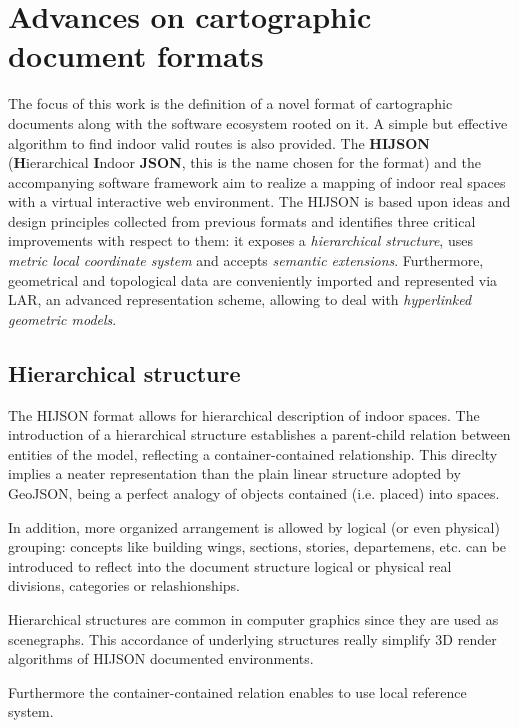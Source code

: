 
\section{Advances on cartographic document formats}\label{advances-on-cartographic-document-format}

The focus of this work is the definition of a novel format of cartographic
documents along with the software ecosystem rooted on it. A simple but
effective algorithm to find indoor valid routes is also provided. The
\textbf{HIJSON} (\textbf{H}ierarchical \textbf{I}ndoor \textbf{JSON}, this is
the name chosen for the format) and the accompanying software framework aim
to realize a mapping of indoor real spaces with a virtual interactive web
environment. The HIJSON is based upon ideas and design principles collected
from previous formats and identifies three critical improvements with respect
to them: it exposes a \emph{hierarchical structure}, uses \emph{metric local
coordinate system} and accepts \emph{semantic extensions}. Furthermore, geometrical 
and topological data are conveniently imported and represented via LAR, an advanced 
representation scheme, allowing to deal with \emph{hyperlinked geometric models}.

\subsection{Hierarchical structure}\label{hierarchical-structure}

The HIJSON format allows for hierarchical description of indoor spaces. The
introduction of a hierarchical structure establishes a parent-child relation
between entities of the model, reflecting a container-contained relationship.
This direclty implies a neater representation than the plain linear structure
adopted by GeoJSON, being a perfect analogy of objects contained (i.e.
placed) into spaces.

In addition, more organized arrangement is allowed by logical (or even
physical) grouping: concepts like building wings, sections, stories,
departemens, etc. can be introduced to reflect into the document structure
logical or physical real divisions, categories or relashionships.

Hierarchical structures are common in computer graphics since they are used as
scenegraphs. This accordance of underlying structures really simplify 3D
render algorithms of HIJSON documented environments.

Furthermore the container-contained relation enables to use local reference system.


